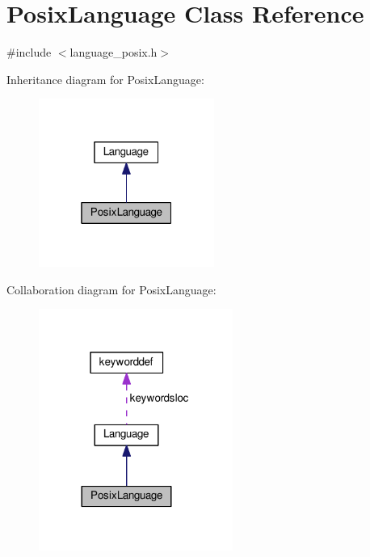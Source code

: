 \hypertarget{classPosixLanguage}{}\section{Posix\+Language Class Reference}
\label{classPosixLanguage}


{\ttfamily \#include $<$language\+\_\+posix.\+h$>$}



Inheritance diagram for Posix\+Language\+:\nopagebreak
\begin{figure}[H]
\begin{center}
\leavevmode
\includegraphics[width=163pt]{classPosixLanguage__inherit__graph}
\end{center}
\end{figure}


Collaboration diagram for Posix\+Language\+:\nopagebreak
\begin{figure}[H]
\begin{center}
\leavevmode
\includegraphics[width=180pt]{classPosixLanguage__coll__graph}
\end{center}
\end{figure}
